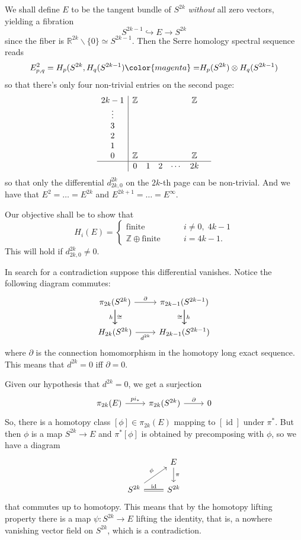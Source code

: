We shall define $E$ to be the tangent bundle of $S^{2k}$  \textit{without} all zero vectors, yielding a fibration
\[S^{2k-1}\hookrightarrow E\to S^{2k}\]
since the fiber is $\mathbb{R}^{2k}\backslash \{0\}\simeq S^{2k-1}$. Then the Serre homology spectral sequence reads
\[E^{2}_{p,q}=H_{p}(S^{2k},H_{q}(S^{2k-1}){\color{magenta}=}H_{p}(S^{2k})\otimes H_{q}(S^{2k-1})\]
so that there's only four non-trivial entries on the second page:
\begin{align*}
\begin{array}{c|c c c c c c}
	2k-1&\mathbb{Z}&&&&\mathbb{Z}&\\
	\vdots &&&&&&\\
	3&&&&&&\\
	2&&&&&&\\
	1&&&&&&\\
	0&\mathbb{Z}&&&&\mathbb{Z}&\\
	\hline
	&0&1&2&\cdots &2k&
\end{array}
\end{align*}
so that only the differential $d^{2k}_{2k,0}$ on the $2k$-th page can be non-trivial. And we have that $E^{2}= \ldots=E^{2k}$ and $E^{2k+1}=\ldots=E^{\infty}$.

Our objective shall be to show that
\[H_{i}(E)=\begin{cases}
	\text{finite} \qquad &i\neq 0,\; 4k-1\\
	\mathbb{Z} \oplus \text{finite} \qquad &i=4k-1.
\end{cases}\]
{\color{magenta}This will hold if $d^{2k}_{2k,0}\neq 0$.}

In search for a contradiction suppose this differential vanishes. {\color{magenta}Notice} the following diagram commutes:
\[\begin{tikzcd}
	\pi_{2k}(S^{2k})\arrow[r,"\partial"]\arrow[d,swap,"h"]\arrow[d,"\cong "]&\pi_{2k-1}(S^{2k-1})\arrow[d,"h"]\arrow[d,"\cong ",swap]\\
	H_{2k}(S^{2k})\arrow[r,"d^{2k}",swap]&H_{2k-1}(S^{2k-1})
\end{tikzcd}\]
where $\partial$ is the connection homomorphism in the homotopy long exact sequence. This means that $d^{2k}=0$ iff $\partial=0$.

Given our hypothesis that $d^{2k}=0$, we get a surjection
\[\begin{tikzcd}
	\pi_{2k}(E)\arrow[r,"pi_{*}"]&\pi_{2k}(S^{2k})\arrow[r,"\partial"]&0
\end{tikzcd}\]
So, there is a homotopy class $[\phi]\in \pi_{2k}(E)$ mapping to $[\operatorname{id}]$ under $\pi^{*}$. But then $\phi$ is a map $S^{2k}\to E$ and $\pi^{*}[\phi]$ is obtained by precomposing with $\phi$, so we have a diagram
\[\begin{tikzcd}
	&E\arrow[d,"\pi"]\\
	S^{2k}\arrow[ur,"\phi"]\arrow[r,equals,"\operatorname{id}"]&S^{2k}
\end{tikzcd}\]
that commutes {\color{magenta}up to homotopy}. This means that by the {\color{magenta}homotopy lifting property} there is a map $\psi:S^{2k}\to E$ lifting the identity, that is, a nowhere vanishing vector field on $S^{2k}$, which is a contradiction.

\clearpage
{}
\printbibliography
\clearpage

